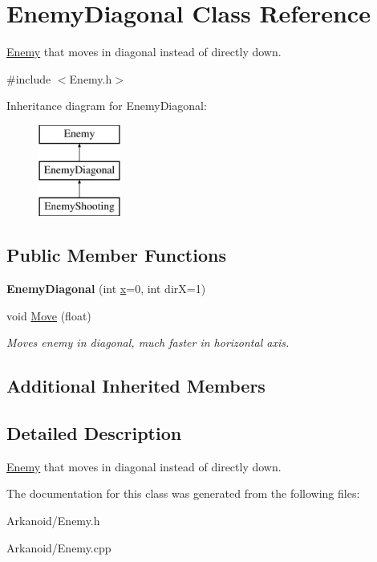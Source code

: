 \hypertarget{class_enemy_diagonal}{}\section{Enemy\+Diagonal Class Reference}
\label{class_enemy_diagonal}


\hyperlink{class_enemy}{Enemy} that moves in diagonal instead of directly down.  




{\ttfamily \#include $<$Enemy.\+h$>$}

Inheritance diagram for Enemy\+Diagonal\+:\begin{figure}[H]
\begin{center}
\leavevmode
\includegraphics[height=3.000000cm]{class_enemy_diagonal}
\end{center}
\end{figure}
\subsection*{Public Member Functions}
\begin{DoxyCompactItemize}
\item 
\mbox{\label{class_enemy_diagonal_a7c154e80303b201f5d5e28905f9d71f9}} 
{\bfseries Enemy\+Diagonal} (int \hyperlink{class_enemy_a05e9e91e87d6eae0da31cc6d78a0b43d}{x}=0, int dirX=1)
\item 
\mbox{\label{class_enemy_diagonal_aa33718254422fa69663e22c00e80d1d9}} 
void \hyperlink{class_enemy_diagonal_aa33718254422fa69663e22c00e80d1d9}{Move} (float)
\begin{DoxyCompactList}\small\item\em Moves enemy in diagonal, much faster in horizontal axis. \end{DoxyCompactList}\end{DoxyCompactItemize}
\subsection*{Additional Inherited Members}


\subsection{Detailed Description}
\hyperlink{class_enemy}{Enemy} that moves in diagonal instead of directly down. 

The documentation for this class was generated from the following files\+:\begin{DoxyCompactItemize}
\item 
Arkanoid/Enemy.\+h\item 
Arkanoid/Enemy.\+cpp\end{DoxyCompactItemize}
